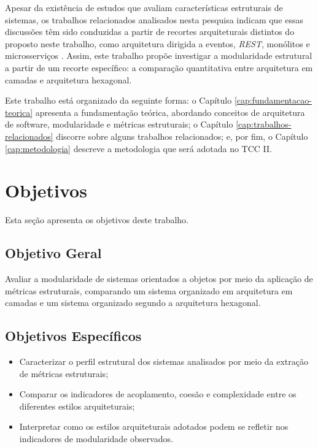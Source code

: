 Apesar da existência de estudos que avaliam características estruturais de sistemas, os trabalhos relacionados analisados 
nesta pesquisa indicam que essas discussões têm sido conduzidas a partir de recortes arquiteturais distintos do proposto 
neste trabalho, como arquitetura dirigida a eventos, \textit{REST}, monólitos e microsserviços \cite{lazzari2022,cintra2025,vale2025}. 
Assim, este trabalho propõe investigar a modularidade estrutural a partir de um recorte específico: a comparação quantitativa 
entre arquitetura em camadas e arquitetura hexagonal.

Este trabalho está organizado da seguinte forma: 
o Capítulo \ref{cap:fundamentacao-teorica} apresenta a fundamentação teórica, abordando conceitos de arquitetura de software, modularidade e métricas estruturais; 
o Capítulo \ref{cap:trabalhos-relacionados} discorre sobre alguns trabalhos relacionados; 
e, por fim, o Capítulo \ref{cap:metodologia} descreve a metodologia que será adotada no TCC II.  


\section{Objetivos}
\label{sec:objetivos}

Esta seção apresenta os objetivos deste trabalho.

\subsection{Objetivo Geral}
\label{sec:objetivo-geral}

Avaliar a modularidade de sistemas orientados a objetos por meio da aplicação de métricas estruturais, 
comparando um sistema organizado em arquitetura em camadas e um sistema organizado segundo a arquitetura hexagonal.

\subsection{Objetivos Específicos}
\label{sec:objetivos-especificos}

\begin{itemize}
    \item Caracterizar o perfil estrutural dos sistemas analisados por meio da extração de métricas estruturais;
    
    \item Comparar os indicadores de acoplamento, coesão e complexidade entre os diferentes estilos arquiteturais;
    
    \item Interpretar como os estilos arquiteturais adotados podem se refletir nos indicadores de modularidade observados.
\end{itemize}